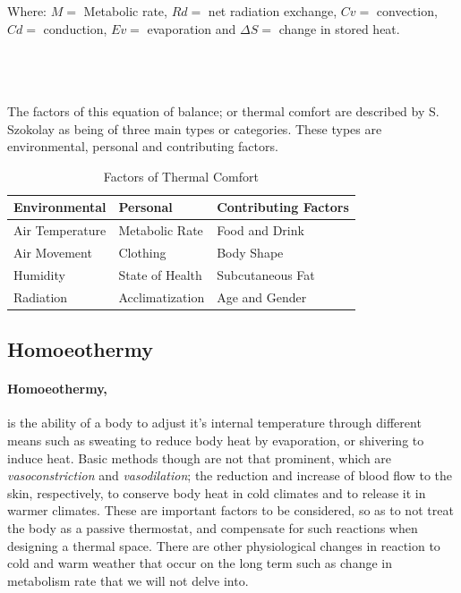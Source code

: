 \documentclass[a4paper,twoside,12pt,openright,final,oldfontcommands]{memoir}
\begin{document}
\begin{minipage}{\dimexpr\textwidth-3cm}
{\footnotesize Where: $M=$ Metabolic rate, $Rd=$ net radiation exchange, $Cv=$
convection, $Cd=$ conduction, $Ev=$ evaporation and $\Delta S=$ change in stored heat.}
\end{minipage}\\\\\\
The factors of this equation of balance; or thermal comfort are described by S.
Szokolay \cite{szokolay08} as being of three main types or categories. These types are environmental,
personal and contributing factors.
\newline

\begin{table}[htbp]
\centering
\begin{tabular}{lll}
\hline
Environmental	& Personal			& Contributing Factors\\ \hline
Air Temperature	& Metabolic Rate	& Food and Drink\\
Air Movement	& Clothing			& Body Shape\\
Humidity		& State of Health	& Subcutaneous Fat\\
Radiation		& Acclimatization	& Age and Gender\\
\hline
\end{tabular}
\caption[Factors of Thermal Comfort]{Factors of Thermal Comfort \cite{szokolay08}}
\label{FactorsOfComfort}
\end{table}

\subsection{Homoeothermy}
\paragraph{Homoeothermy,}is the ability of a body to adjust it's internal temperature through
different means such as sweating to reduce body heat by evaporation, or shivering to induce heat.
Basic methods though are not that prominent, which are \emph{vasoconstriction} and
\emph{vasodilation}; the reduction and increase of blood flow to the skin, respectively, to conserve
body heat in cold climates and to release it in warmer climates. These are important factors to be
considered, so as to not treat the body as a passive thermostat, and compensate for such reactions
when designing a thermal space. There are other physiological changes in reaction to cold and warm
weather that occur on the long term such as change in metabolism rate that we will not delve into.
\end{document}
